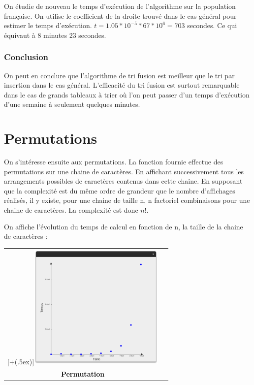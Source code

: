 \documentclass[12pt]{article}
\newcommand*{\addheight}[2][.5ex]{%
  \raisebox{0pt}[\dimexpr\height+(#1)\relax]{#2}%
}
\begin{document}
On étudie de nouveau le temps d'exécution de l'algorithme sur la population française.
On utilise le coefficient de la droite trouvé dans le cas général pour estimer le temps d'exécution. $ t = 1.05*10^{-5} * 67*10^6 = 703 $ secondes. Ce qui équivaut à 8 minutes 23 secondes.

\subsubsection*{Conclusion}

On peut en conclure que l'algorithme de tri fusion est meilleur que le tri par insertion dans le cas général. L'efficacité du tri fusion est surtout remarquable dans le cas de grands tableaux à trier où l'on peut passer d'un temps d'exécution d'une semaine à seulement quelques minutes.


\section{Permutations}

On s'intéresse ensuite aux permutations.
La fonction fournie effectue des permutations sur une chaine de caractères. En affichant successivement tous les arrangements possibles de caractères contenus dans cette chaine.
En supposant que la complexité est du même ordre de grandeur que le nombre d'affichages réalisés, il y existe, pour une chaine de taille n, n factoriel combinaisons pour une chaine de caractères. La complexité est donc $n!$.


On affiche l'évolution du temps de calcul en fonction de n, la taille de la chaine de caractères :

\begin{tabular}[H]{c c}
    \addheight{\includegraphics[width=18em]{permu.png}}  & \\
    \small \textbf{Permutation} & \\
\end{tabular}
\end{document}

